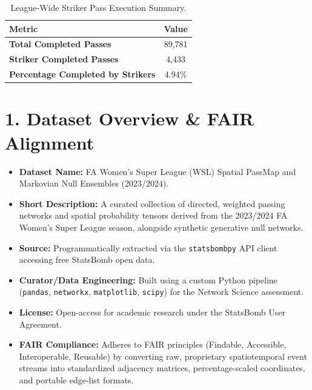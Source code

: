 \documentclass[12pt, a4paper]{article}
\begin{document}
\begin{table}[htbp]
    \centering
    \small
    \caption{League-Wide Striker Pass Execution Summary.}
    \label{tab:league_striker_summary}
    \begin{tabularx}{0.75\textwidth}{X c}
        \toprule
        \textbf{Metric} & \textbf{Value} \\
        \midrule
        \textbf{Total Completed Passes} & 89,781 \\
        \textbf{Striker Completed Passes} & 4,433 \\
        \textbf{Percentage Completed by Strikers} & 4.94\% \\
        \bottomrule
    \end{tabularx}
\end{table}


\clearpage
\section*{1. Dataset Overview \& FAIR Alignment}
\begin{itemize}
    \item \textbf{Dataset Name:} FA Women's Super League (WSL) Spatial PassMap and Markovian Null Ensembles (2023/2024).
    \item \textbf{Short Description:} A curated collection of directed, weighted passing networks and spatial probability tensors derived from the 2023/2024 FA Women's Super League season, alongside synthetic generative null networks.
    \item \textbf{Source:} Programmatically extracted via the \texttt{statsbombpy} API client accessing free StatsBomb open data.
    \item \textbf{Curator/Data Engineering:} Built using a custom Python pipeline (\texttt{pandas}, \texttt{networkx}, \texttt{matplotlib}, \texttt{scipy}) for the Network Science assessment.
    \item \textbf{License:} Open-access for academic research under the StatsBomb User Agreement.
    \item \textbf{FAIR Compliance:} Adheres to FAIR principles (Findable, Accessible, Interoperable, Reusable) by converting raw, proprietary spatiotemporal event streams into standardized adjacency matrices, percentage-scaled coordinates, and portable edge-list formats.
\end{itemize}
\end{document}
